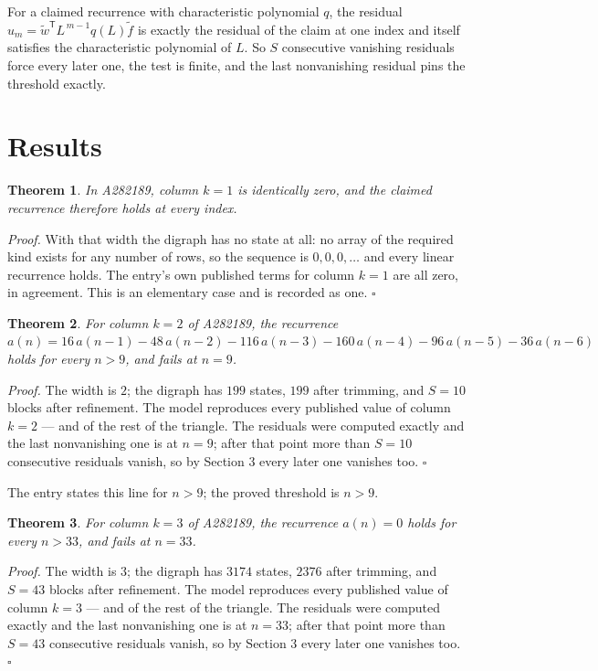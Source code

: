 \documentclass[11pt]{article}
\newtheorem{theorem}{Theorem}
\theoremstyle{definition}
\begin{document}
For a claimed recurrence with characteristic polynomial $q$, the residual $u_m = \tilde w^{\mathsf T}L^{\,m-1}q(L)\tilde f$ is exactly the residual of the claim at one index and itself satisfies the characteristic polynomial of $L$. So $S$ consecutive vanishing residuals force every later one, the test is finite, and the last nonvanishing residual pins the threshold exactly.

\section{Results}

\begin{theorem} In A282189, column $k = 1$ is identically zero, and the claimed recurrence therefore holds at every index.\end{theorem}

{\itshape Proof.} With that width the digraph has no state at all: no array of the required kind exists for any number of rows, so the sequence is $0,0,0,\dots$ and every linear recurrence holds. The entry's own published terms for column $k = 1$ are all zero, in agreement. This is an elementary case and is recorded as one. $\square$

\begin{theorem} For column $k = 2$ of A282189, the recurrence $a(n) = 16\,a(n-1) - 48\,a(n-2) - 116\,a(n-3) - 160\,a(n-4) - 96\,a(n-5) - 36\,a(n-6)$ holds for every $n > 9$, and fails at $n = 9$.\end{theorem}

{\itshape Proof.} The width is $2$; the digraph has $199$ states, $199$ after trimming, and $S = 10$ blocks after refinement. The model reproduces every published value of column $k = 2$ --- and of the rest of the triangle. The residuals were computed exactly and the last nonvanishing one is at $n = 9$; after that point more than $S = 10$ consecutive residuals vanish, so by Section 3 every later one vanishes too. $\square$

The entry states this line for $n > 9$; the proved threshold is $n > 9$.

\begin{theorem} For column $k = 3$ of A282189, the recurrence $a(n) = 0$ holds for every $n > 33$, and fails at $n = 33$.\end{theorem}

{\itshape Proof.} The width is $3$; the digraph has $3174$ states, $2376$ after trimming, and $S = 43$ blocks after refinement. The model reproduces every published value of column $k = 3$ --- and of the rest of the triangle. The residuals were computed exactly and the last nonvanishing one is at $n = 33$; after that point more than $S = 43$ consecutive residuals vanish, so by Section 3 every later one vanishes too. $\square$
\end{document}

